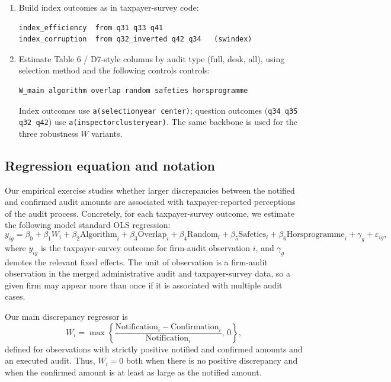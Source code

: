\documentclass{article}
\begin{document}
\begin{enumerate}
\begin{verbatim}
selfreported_audit = 1 if q28a in [2018,2021] or q29a in [2018,2021]
\end{verbatim}
Panel A uses \texttt{q1 $\neq$ . AND selfreported  = 1}; Panel B uses \texttt{q1 $\neq$ .}.
\item Build index outcomes as in taxpayer-survey code:
\begin{verbatim}
index_efficiency  from q31 q33 q41
index_corruption  from q32_inverted q42 q34   (swindex)
\end{verbatim}
\item Estimate Table 6 / D7-style columns by audit type (full, desk, all), using selection method and the following controls controls:
\begin{verbatim}
W_main algorithm overlap random safeties horsprogramme
\end{verbatim}
Index outcomes use \texttt{a(selectionyear center)}; question outcomes (\texttt{q34 q35 q32 q42}) use \texttt{a(inspectorclusteryear)}. The same backbone is used for the three robustness \(W\) variants.
\end{enumerate}

\subsection{Regression equation and notation}

Our empirical exercise studies whether larger discrepancies between the notified and confirmed audit amounts are associated with taxpayer-reported perceptions of the audit process. Concretely, for each taxpayer-survey outcome, we estimate the following model standard OLS regression:
\[
y_{ig}
=
\beta_0
+ \beta_1 W_i
+ \beta_2 \text{Algorithm}_i
+ \beta_3 \text{Overlap}_i
+ \beta_4 \text{Random}_i
+ \beta_5 \text{Safeties}_i
+ \beta_6 \text{Horsprogramme}_i
+ \gamma_g
+ \varepsilon_{ig},
\]
where \(y_{ig}\) is the taxpayer-survey outcome for firm-audit observation \(i\), and \(\gamma_g\) denotes the relevant fixed effects. The unit of observation is a firm-audit observation in the merged administrative audit and taxpayer-survey data, so a given firm may appear more than once if it is associated with multiple audit cases.

Our main discrepancy regressor is
\[
W_i
=
\max\left\{
\frac{\text{Notification}_i-\text{Confirmation}_i}{\text{Notification}_i},
\,0
\right\},
\]
defined for observations with strictly positive notified and confirmed amounts and an executed audit. Thus, \(W_i=0\) both when there is no positive discrepancy and when the confirmed amount is at least as large as the notified amount.
\end{document}
